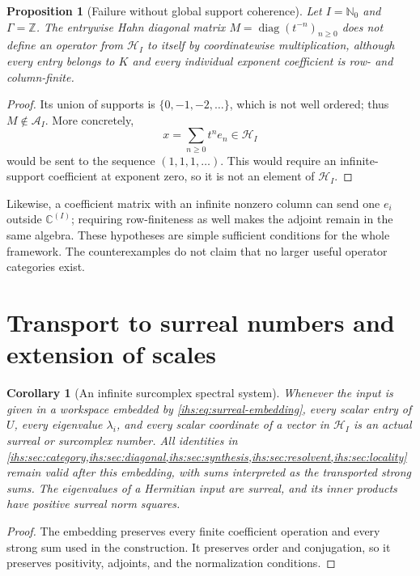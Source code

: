 \documentclass[11pt,a4paper]{article}
\numberwithin{equation}{section}
\newtheorem{proposition}[proposition]{Proposition}
\newtheorem{corollary}[corollary]{Corollary}
\theoremstyle{definition}
\theoremstyle{remark}
\newcommand{\C}{\mathbb C}
\newcommand{\N}{\mathbb N}
\newcommand{\Z}{\mathbb Z}
\newcommand{\K}{K}
\newcommand{\Hrf}{\mathcal H_I}
\newcommand{\Arf}{\mathcal A_I}
\newcommand{\diag}{\operatorname{diag}}
\begin{document}
\begin{proposition}[Failure without global support coherence]\label{ihs:rf:prop:incoherent}
Let $I=\N_0$ and $\Gamma=\Z$. The entrywise Hahn diagonal matrix
$M=\diag(t^{-n})_{n\ge0}$ does not define an operator from $\Hrf$ to itself
by coordinatewise multiplication, although every entry belongs to $\K$ and
every individual exponent coefficient is row- and column-finite.
\end{proposition}
\begin{proof}
Its union of supports is $\{0,-1,-2,\ldots\}$, which is not well ordered;
thus $M\notin\Arf$. More concretely,
\[
 x=\sum_{n\ge0}t^n e_n\in\Hrf
\]
would be sent to the sequence $(1,1,1,\ldots)$. This would require an
infinite-support coefficient at exponent zero, so it is not an element of
$\Hrf$.
\end{proof}

Likewise, a coefficient matrix with an infinite nonzero column can send one
$e_i$ outside $\C^{(I)}$; requiring row-finiteness as well makes the adjoint
remain in the same algebra. These hypotheses are simple sufficient
conditions for the whole framework. The counterexamples do not claim that no
larger useful operator categories exist.

\section{Transport to surreal numbers and extension of scales}\label{ihs:sec:transport}

\begin{corollary}[An infinite surcomplex spectral system]\label{ihs:rf:cor:surcomplex}
Whenever the input is given in a workspace embedded by
\eqref{ihs:eq:surreal-embedding}, every scalar entry of $U$, every
eigenvalue $\lambda_i$, and every scalar coordinate of a vector in $\Hrf$ is
an actual surreal or surcomplex number. All identities in
\cref{ihs:sec:category,ihs:sec:diagonal,ihs:sec:synthesis,ihs:sec:resolvent,ihs:sec:locality}
remain valid after this embedding, with sums interpreted as the transported
strong sums. The eigenvalues of a Hermitian input are surreal, and its inner
products have positive surreal norm squares.
\end{corollary}
\begin{proof}
The embedding preserves every finite coefficient operation and every strong
sum used in the construction. It preserves order and conjugation, so it
preserves positivity, adjoints, and the normalization conditions.
\end{proof}
\end{document}
